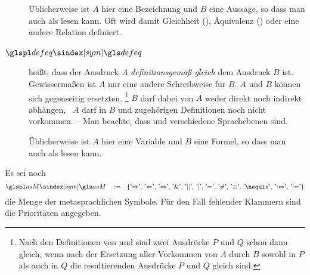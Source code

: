 \begin{description}
	Üblicherweise ist $A$ hier eine Bezeichnung und $B$ eine Aussage, so dass man  auch als  lesen kann.
	Oft wird damit Gleichheit (\symqt{$=$}), Äquivalenz (\symqt{$\equiv$}) oder eine andere Relation definiert.
	\item[$\glsSym{defeq}$~\emph{\Idx{Definition}}]
	 heißt, dass der Ausdruck $A$ \emph{definitionsgemäß gleich} dem Ausdruck $B$ ist.
	Gewissermaßen ist $A$ nur eine andere Schreibweise für $B$.
	$A$ und $B$ können sich gegenseitig ersetzten.%
	\footnote{%
		Nach den Definitionen von \symqt{$\metadefeq$} und  sind zwei Ausdrücke $P$ und $Q$ schon dann gleich, wenn nach der Ersetzung aller Vorkommen von $A$ durch $B$ sowohl in $P$ als auch in $Q$ die resultierenden Ausdrücke $\overline{P}$ und $\overline{Q}$ gleich sind.%
	}
	$B$ darf dabei von $A$ weder direkt noch indirekt abhängen, \textdh\ $A$ darf in $B$ und zugehörigen Definitionen noch nicht vorkommen.
	-- Man beachte, dass \symqt{$\metadefeq$} und  verschiedene Sprachebenen sind.

	Üblicherweise ist $A$ hier eine Variable und $B$ eine Formel, so dass man  auch als  lesen kann.
\end{description}
%
Es sei noch
\[
	\label{eq:asM} \glsSym{asM} \quad \defeq \quad \{ \text{\symqt{$\metaimp$}, \symqt{$\metarep$}, \symqt{$\metaequiv$}, \symqt{$\metaand$}, \symqt{$\metaor$}, \symqt{$\srand$}, \symqt{$\eq$}, \symqt{$\ne$}, \symqt{$\equiv$}, \symqt{$\nequiv$}, \symqt{$\metadefeq$}, \symqt{$\defeq$}} \}
\]
die Menge der metasprachlichen Symbole.
Für den Fall fehlender Klammern sind die Prioritäten  angegeben.

